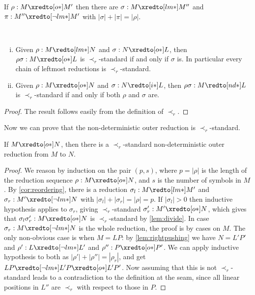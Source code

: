 \begin{corollary}\label{cor:reordering}
  If $\rho:M\xredto[o*]M'$ then there are $\sigma:M\xredto[lm*]M''$
  and $\pi:M''\xredto[\neg lm*]M'$ with $|\sigma| +
  |\pi| = |\rho|$.
\end{corollary}


\begin{lemma}\label{lem:divide}\
\begin{enumerate}[(i)]
 \item Given $\rho : M \redto[lm*] N$ and $\sigma: N \xredto[o*] L$,
then $\rho\sigma: M\xredto[o*] L$ is
 $\prec_r$-standard if and only if $\sigma$ is.
 In particular every chain of leftmost reductions is $\prec_r$-standard.
 \item Given $\rho : M\xredto[o*] N$ and $\sigma: N \redto[i*] L$,
then $\rho\sigma: M \redto[nd*] L$ is
 $\prec_r$-standard if and only if both $\rho$ and $\sigma$ are.
\end{enumerate}
\end{lemma}
 \begin{proof}
 The result follows easily from the definition of $\prec_r$.
 \end{proof}
Now we can prove that the non-deterministic outer reduction is $\prec_{r}$-standard.
\begin{lemma}
  \label{lem:stdouter}
  If $M \xredto[o*] N$, then there is a $\prec_r$-standard
  non-deterministic outer reduction from $M$ to $N$.
\end{lemma}
\begin{proof}
   We reason by induction on the pair $(p,s)$, where $p=|\rho|$ is the
  length of the reduction sequence $\rho:M \xredto[o*] N$, and $s$ is
  the number of symbols in $M$.  By \autoref{cor:reordering},
  there is a reduction $\sigma_l:M \redto[lm*] M'$ and $\sigma_r: M'
  \xredto[\neg lm*] N$ with $|\sigma_l| + |\sigma_r| = |\rho| = p$.
  If $|\sigma_l|>0$ then inductive hypothesis applies to $\sigma_r$,
  giving $\prec_r$-standard $\sigma'_r: M' \xredto[o*] N$, which
  gives that $\sigma_l\sigma'_r: M\xredto[o*] N$ is
  $\prec_r$-standard by \autoref{lem:divide}.
  In case $\sigma_r: M \xredto[\neg lm*] N$ is the
  whole reduction, the proof is by cases on $M$.
 The only non-obvious case is when $M=LP$: by \autoref{lem:rightpushing} we have $N=L'P'$ and
    $\rho': L \xredto[\neg lm*] L'$ and $\rho'': P \xredto[o*]
    P'$. We can apply inductive hypothesis to both as $|\rho'| +
    |\rho''| = |\rho_r|$, and get $LP \xredto[\neg lm*] L'P
    \xredto[o*] L'P'$. Now assuming that this is not
    $\prec_r$-standard leads to a contradiction to the definition at
    the seam, since all linear positions in $L''$ are $\prec_r$ with respect to
    those in $P$.
\end{proof}
